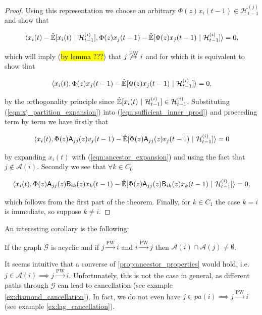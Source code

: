 \documentclass[12pt]{article}
\def\pwgc{\overset{\text{PW}}{\rightarrow}}  %
\def\gcg{\mathcal{G}}  %
\def\B{\mathsf{B}}  %
\def\A{\mathsf{A}}  %
\def\H{\mathcal{H}}  %
\newcommand{\linE}[2]{\hat{\E}[#1\ |\ #2]}  %
\newcommand{\pa}[1]{pa(#1)}  %
\newcommand{\anc}[1]{\mathcal{A}(#1)}  %
\begin{document}
\begin{proof}
  Using this representation we choose an arbitrary $\Phi(z) x_i(t - 1) \in \H_{t - 1}^{(j)}$ and show that

  \begin{equation}
    \inner{x_i(t) - \linE{x_i(t)}{\H_{t - 1}^{(i)}}}{\Phi(z)x_j(t - 1) - \linE{\Phi(z)x_j(t - 1)}{\H_{t - 1}^{(i)}}} = 0,
  \end{equation}

  which will imply (\hl{by lemma ???}) that $j \not\pwgc i$ and for which it is equivalent to show that

  \begin{equation}
    \label{eqn:sufficient_inner_prod}
    \inner{x_i(t)}{\Phi(z)x_j(t - 1) - \linE{\Phi(z)x_j(t - 1)}{\H_{t - 1}^{(i)}}} = 0,
  \end{equation}

  by the orthogonality principle since $\linE{x_i(t)}{\H_{t - 1}^{(i)}} \in \H_{t - 1}^{(i)}$.  Substituting (\ref{eqn:xj_partition_expansion}) into (\ref{eqn:sufficient_inner_prod}) and proceeding term by term we have firstly that

  \begin{equation*}
    \inner{x_i(t)}{\Phi(z)\A_{jj}(z)v_j(t - 1) - \linE{\Phi(z)\A_{jj}(z)v_j(t - 1)}{\H_{t - 1}^{(i)}}} = 0
  \end{equation*}

  by expanding $x_i(t)$ with (\ref{eqn:ancestor_expansion}) and using the fact that $j \not \in \anc{i}$.  Secondly we see that $\forall k \in C_0$

  \begin{equation*}
    \inner{x_i(t)}{\Phi(z)\A_{jj}(z)\B_{ik}(z)x_k(t - 1) - \linE{\Phi(z)\A_{jj}(z)\B_{ik}(z)x_k(t - 1)}{\H_{t - 1}^{(i)}}} = 0,
  \end{equation*}

  which follows from the first part of the theorem.  Finally, for $k \in C_1$ the case $k = i$ is immediate, so suppose $k \ne i$.  
\end{proof}

An interesting corollary is the following:

\begin{corollary}
  If the graph $\gcg$ is acyclic and if $j \pwgc i$ and $i \pwgc j$ then $\anc{i} \cap \anc{j} \ne \emptyset$.
\end{corollary}

It seems intuitive that a converse of \ref{prop:ancestor_properties}
would hold, i.e. $j \in \anc{i} \implies j \pwgc i$.  Unfortunately,
this is not the case in general, as different paths through $\gcg$ can
lead to cancellation (see example \ref{ex:diamond_cancellation}).  In
fact, we do not even have $j \in \pa{i} \implies j \pwgc i$ (see
example \ref{ex:lag_cancellation}).
\end{document}
